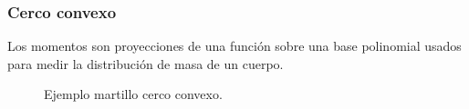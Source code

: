 \documentclass[a4paper, 11pt]{article}
\begin{document}
\subsubsection{Cerco convexo}

Los momentos son proyecciones de una función sobre una base polinomial usados para medir la distribución de masa de un cuerpo.

\begin{figure}[ht]%
    \centering
    \qquad
    \caption{Ejemplo martillo cerco convexo.}%
    \label{entropia}%
\end{figure}
\end{document}
